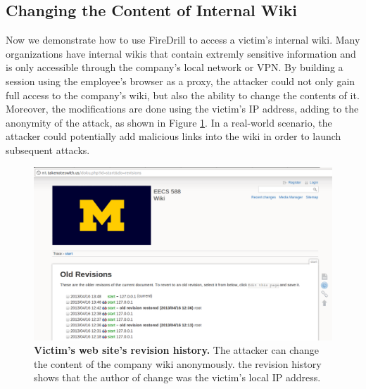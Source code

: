 \subsection{Changing the Content of Internal Wiki}
Now we demonstrate how to use FireDrill to access a victim's internal wiki. Many organizations have internal wikis that contain extremly sensitive information and is only accessible through the company's local network or VPN. By building a session using the employee's browser as a proxy, the attacker could not only gain full access to the company's wiki, but also the ability to change the contents of it. Moreover, the modifications are done using the victim's IP address, adding to the anonymity of the attack, as shown in Figure \ref{fig:oldrevisions}. In a real-world scenario, the attacker could potentially add malicious links into the wiki in order to launch subsequent attacks.

\begin{figure}[b]
\centering
\includegraphics[width=0.8\columnwidth]{oldrevisions.png}
\caption{\textbf{Victim's web site's revision history.} The attacker can change the content of the company wiki anonymously. the revision history shows that the author of change was the victim's local IP address.}
\label{fig:oldrevisions}
\end{figure}

